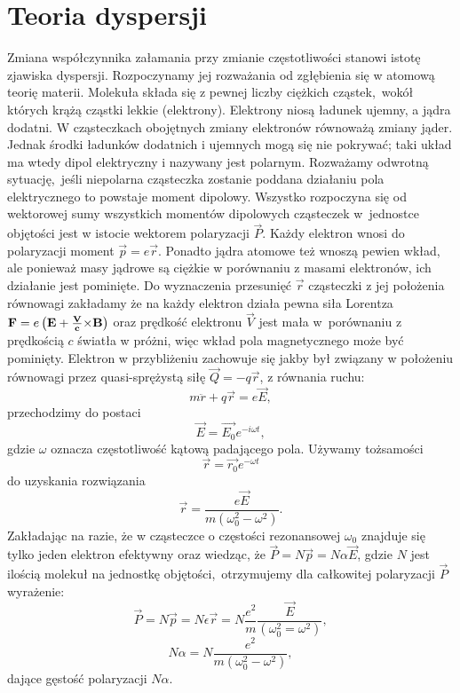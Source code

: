 \section{Teoria dyspersji}
\indent Zmiana współczynnika załamania przy zmianie częstotliwości stanowi istotę zjawiska dyspersji. Rozpoczynamy jej rozważania od zgłębienia się w atomową teorię materii. Molekuła składa się z pewnej liczby ciężkich cząstek,~wokół których krążą cząstki lekkie (elektrony). E\-le\-ktro\-ny niosą ładunek ujemny, a jądra dodatni. W cząsteczkach obojętnych zmiany elektronów równoważą zmiany jąder. Jednak środki ładunków dodatnich i ujemnych mogą się nie pokrywać; taki układ ma wtedy dipol elektryczny i nazywany jest polarnym. Rozważamy odwrotną sytuację,~jeśli niepolarna cząsteczka zostanie poddana działaniu pola elektrycznego to powstaje moment dipolowy. Wszystko rozpoczyna się od wektorowej sumy wszystkich momentów dipolowych cząsteczek w~jednostce objętości jest w istocie wektorem polaryzacji $ \vec{P}$. Każdy elektron wnosi do polaryzacji moment $\vec{p} = e \vec{r}$. Ponadto jądra atomowe też wnoszą pewien wkład, ale ponieważ masy jądrowe są ciężkie w porównaniu z masami elektronów, ich działanie jest pominięte. Do wyznaczenia przesunięć $\vec{r}$ cząsteczki z jej położenia równowagi zakładamy że na każdy elektron działa pewna siła Lorentza ${\bf F}=e\left({{\bf E}+{\bf \frac{{\bf V}}{c}}{\times}{\bf {\bf B}}}\right)$ oraz prędkość elektronu $\vec{V}$ jest mała w~porównaniu z prędkością $c$ światła w próżni, więc wkład pola magnetycznego może być pominięty. Elektron w przybliżeniu zachowuje się jakby był związany w położeniu równowagi przez quasi-sprężystą siłę $\vec{Q}=-q\vec{r}$, z równania ruchu:
$$m\ddot{r}+q\vec{r}=e\vec{E},$$
przechodzimy do postaci
$$\vec{E}=\vec{E_0}e^{-i\omega t},$$
gdzie $\omega$ oznacza częstotliwość kątową padającego pola. Używamy tożsamości 
$$\vec{r}=\vec{r_0}e^{-\omega t}$$
do uzyskania rozwiązania
$$\vec{r}=\frac{e\vec{E}}{m(\omega_0^2-\omega^2)}.$$
Zakładając na razie, że w cząsteczce o częstości rezonansowej $\omega_0$ znajduje się tylko jeden e\-le\-ktron efektywny oraz wiedząc, że $\vec{P} = N\vec{p} = N\alpha\vec{E}$, gdzie $N$ jest ilością molekuł na jednostkę objętości,~otrzymujemy dla całkowitej polaryzacji $\vec{P}$ wyrażenie:
$$\vec{P}=N\vec{p}=N\epsilon\vec{r}=N\frac{e^2}{m}\frac{\vec{E}}{(\omega_0^2=\omega^2)},$$
\begin{equation}\label{eq:(30)}
N\alpha =N\frac{e^2}{m(\omega_0^2-\omega^2)},
\end{equation}
dające gęstość polaryzacji $N\alpha$.

